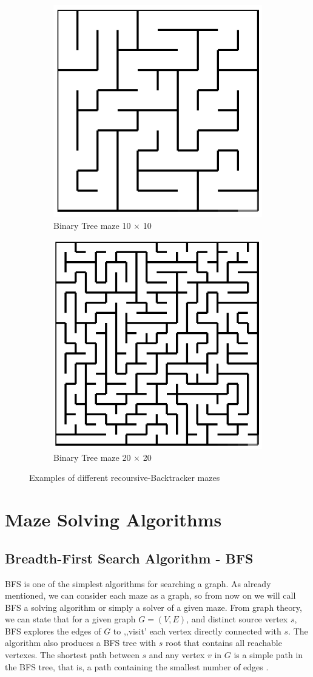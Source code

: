 	\begin{figure}[h]
		\centering
		\begin{subfigure}{.5\textwidth}
		  \centering
		  \includegraphics[width=.5\linewidth]{recursive1010}
		  \caption{Binary Tree maze 10 $\times$ 10}
		  \label{fig:sub1}
		\end{subfigure}
		\begin{subfigure}{.5\textwidth}
		  \centering
		  \includegraphics[width=.5\linewidth]{recursive2020}
		  \caption{Binary Tree maze 20 $\times$ 20}
		  \label{fig:sub2}
		\end{subfigure}
		\caption{Examples of different recoursive-Backtracker mazes}
		\label{fig:test}
		\end{figure}

\section{Maze Solving Algorithms}
\subsection{Breadth-First Search Algorithm - BFS}
BFS is one of the simplest algorithms for searching a graph. As already mentioned, we can consider each maze as a graph, so from now on we will call 
BFS  a solving algorithm or simply a solver of a given maze. From graph theory, we can state that for a given graph $ G = ( V, E) $, and distinct source 
vertex $s$, BFS explores the edges of $G$ to ,,visit’ each vertex directly connected with $s$. The algorithm also produces a BFS tree with $s$ root that 
contains all reachable vertexes. The shortest path  between $s$ and any vertex $v$ in $G$ is a simple path in the BFS tree, that is, a path containing
the smallest number of edges \cite{TCorm}.
